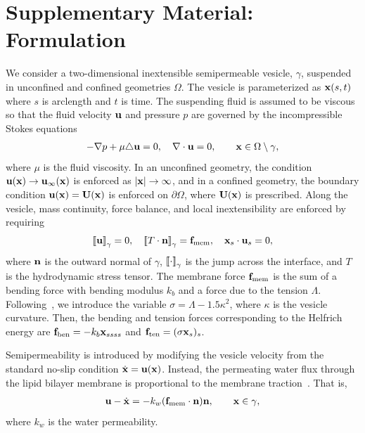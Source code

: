 \documentclass[9pt,twocolumn,twoside,lineno]{pnas-new}
\begin{document}
\section*{Supplementary Material: Formulation}
We consider a two-dimensional inextensible semipermeable vesicle,
$\gamma$, suspended in unconfined and confined geometries $\Omega$. The
vesicle is parameterized as $\mathbf{x}(s,t)$ where $s$ is arclength and $t$ is
time. The suspending fluid is assumed to be viscous so that the fluid
velocity $\mathbf{u}$ and pressure $p$ are governed by the incompressible
Stokes equations
\begin{align}
  \label{eqn:governing}
  -\nabla p + \mu \triangle \mathbf{u} = 0, \quad
  \nabla \cdot \mathbf{u} = 0, \qquad \mathbf{x} \in \Omega \setminus \gamma,
\end{align}
where $\mu$ is the fluid viscosity. In an unconfined geometry, the
condition $\mathbf{u}(\mathbf{x}) \rightarrow \mathbf{u}_\infty(\mathbf{x})$ is enforced as $|\mathbf{x}|
\rightarrow \infty$, and in a confined geometry, the boundary condition
$\mathbf{u}(\mathbf{x}) = \mathbf{U}(\mathbf{x})$ is enforced on $\partial \Omega$, where $\mathbf{U}(\mathbf{x})$
is prescribed. Along the vesicle, mass continuity, force balance, and
local inextensibility are enforced by requiring
\begin{align}
  \label{eqn:jump}
  \left[\!\left[ \mathbf{u} \right]\!\right]_\gamma = 0, \quad
  \left[\!\left[ T\cdot\mathbf{n} \right]\!\right]_\gamma = \mathbf{f}_\mathrm{mem}, \quad
  \mathbf{x}_s \cdot \mathbf{u}_s = 0,
\end{align}
where $\mathbf{n}$ is the outward normal of $\gamma$, $\left[\!\left[ \cdot \right]\!\right]_\gamma$ is the
jump across the interface, and $T$ is the hydrodynamic stress tensor.
The membrane force $\mathbf{f}_\mathrm{mem}$ is the sum of a bending force
with bending modulus $k_b$ and a force due to the tension $\Lambda$.
Following~\cite{vee-gue-zor-bir2009}, we introduce the variable $\sigma
= \Lambda - 1.5\kappa^2$, where $\kappa$ is the vesicle curvature. Then,
the bending and tension forces corresponding to the Helfrich energy are
$\mathbf{f}_\mathrm{ben} = -k_b \mathbf{x}_{ssss}$ and $\mathbf{f}_\mathrm{ten} = (\sigma
\mathbf{x}_s)_s$. 

Semipermeability is introduced by modifying the vesicle velocity from
the standard no-slip condition $\dot{\mathbf{x}} = \mathbf{u}(\mathbf{x})$. Instead,
the permeating water flux through the lipid bilayer membrane is proportional to the
membrane traction~\cite{yao-mor2017}. That is, 
\begin{align}
  \label{eqn:vesicleFlux}
  \mathbf{u} - \dot{\mathbf{x}} = - k_w (\mathbf{f}_\mathrm{mem} \cdot \mathbf{n}) \mathbf{n}, \qquad
  \mathbf{x} \in \gamma,
\end{align}
where $k_w$ is the water permeability.
\end{document}
